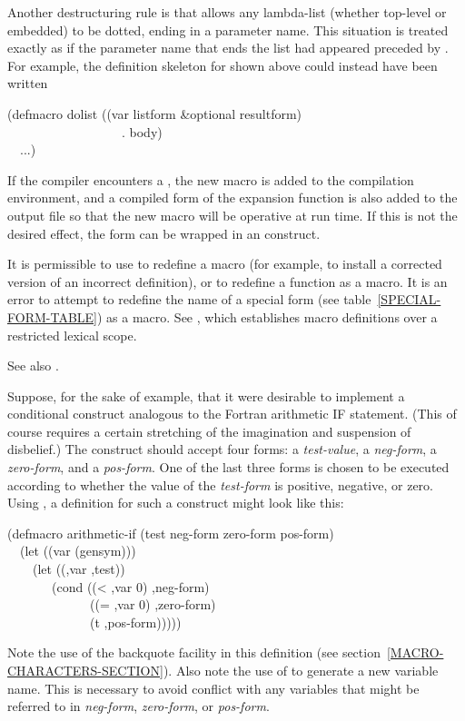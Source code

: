 \begin{defmac}
Another destructuring rule is that  allows any lambda-list
(whether top-level or embedded) to be dotted, ending
in a parameter name.  This situation is treated exactly as if the
parameter name that ends the list had appeared preceded by .
For example, the definition skeleton for  shown above could
instead have been written
\begin{lisp}
(defmacro dolist ((var listform \&optional resultform) \\
~~~~~~~~~~~~~~~~~~. body) \\
~~...)
\end{lisp}

If the compiler encounters a ,
the new macro is added to the compilation
environment, and a compiled form of the expansion function is also added
to the output file so that the new macro will be operative at run time.
If this is not the desired effect, the  form can be wrapped
in an  construct.

It is permissible to use  to redefine a macro
(for example, to install
a corrected version of an incorrect definition), or to redefine
a function as a macro.
It is an error to attempt to redefine the name of a special
form (see table~\ref{SPECIAL-FORM-TABLE}) as a macro.
See , which establishes macro
definitions over a restricted lexical scope.

\begin{newer}
See also .
\end{newer}

Suppose, for the sake of example, that it were desirable
to implement a conditional construct analogous to the
Fortran arithmetic IF statement.  (This of course requires a certain
stretching of the imagination and suspension of disbelief.)
The construct should accept four forms: a {\it test-value},
a {\it neg-form}, a {\it zero-form}, and a {\it pos-form}.
One of the last three forms is chosen to be executed according
to whether the value of the {\it test-form} is positive, negative,
or zero.
Using , a definition for such a construct
might look like this:
\begin{lisp}
(defmacro arithmetic-if (test neg-form zero-form pos-form) \\
~~(let ((var (gensym))) \\
~~~~{\Xbq}(let ((,var ,test)) \\
~~~~~~~(cond ((< ,var 0) ,neg-form) \\
~~~~~~~~~~~~~((= ,var 0) ,zero-form) \\
~~~~~~~~~~~~~(t ,pos-form)))))
\end{lisp}
Note the use of the backquote facility in this definition
(see section~\ref{MACRO-CHARACTERS-SECTION}).
Also note the use of  to generate a new variable name.
This is necessary to avoid conflict with any variables that might
be referred to in {\it neg-form}, {\it zero-form}, or {\it pos-form}.


\end{defmac}
